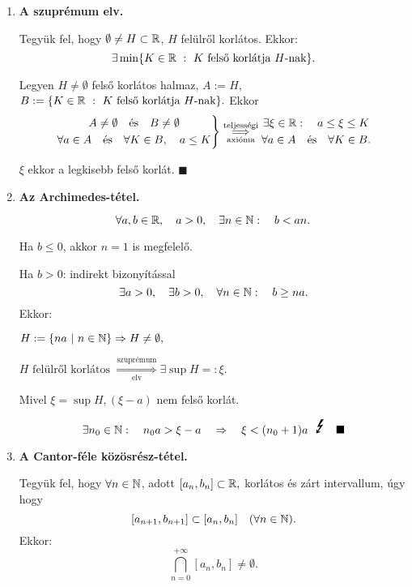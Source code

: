 \documentclass[a4paper,11.5pt]{article}
\begin{document}
	\begin{enumerate}
		\item \textbf{A szuprémum elv.}
		
		Tegyük fel, hogy $\emptyset\not=H \subset \mathbb{R}$, $H$ felülről korlátos. Ekkor:
		\[ \exists\min\{ K \in \mathbb{R}~:~K \text{ felső korlátja }H\text{-nak} \}.  \]
		
		\biz Legyen $H\not=\emptyset$ felső korlátos halmaz, $A:=H$, $B:= \{ K \in \mathbb{R}\ :\ K \text{ felső korlátja }H\text{-nak} \}.$ Ekkor 
		\[ \left.\begin{gathered}
		A \not=\emptyset\quad  \text{és} \quad B\not=\emptyset\\
		\forall a \in A\quad  \text{és} \quad \forall K \in B,\quad  a\leq K
		\end{gathered} \right\} \overset{\text{teljességi}}{\underset{\text{axióma}}{\Longrightarrow}} \begin{gathered}
		\exists \xi \in \mathbb{R}:\quad a\leq\xi\leq K\\
		\forall a \in A\quad \text{és}\quad \forall K \in B.
		\end{gathered} \]
		
		$\xi$ ekkor a legkisebb felső korlát. \quad $\blacksquare$
		
		\item \textbf{Az Archimedes-tétel.}
		
		\[\forall a, b \in \mathbb{R}, \quad a>0,\quad \exists n\in \mathbb{N}: \quad b<an.\]
		
		\biz Ha $b\leq 0$, akkor $n=1$ is megfelelő.
		
		Ha $b>0$: indirekt bizonyítással
		\[ \exists a>0,\quad \exists b>0,\quad  \forall n\in \mathbb{N}: \quad b\geq na. \]
		Ekkor:
		
		$H := \{ na\ |\ n\in\mathbb{N} \}\Rightarrow H\not=\emptyset,$
		
		$H\text{ felülről korlátos } \overset{\text{szuprémum}}{\underset{\text{elv}}{\Longrightarrow}} \exists \sup H =: \xi.$
		
		Mivel $\xi = \sup H, (\xi-a)$ nem felső korlát.
		
		\[ \exists n_0\in\N: \quad n_0a>\xi-a\quad  \Rightarrow\quad  \xi < (n_0+1)a \text{ { \LARGE\Lightning}}\quad \blacksquare\]
		
		\item \textbf{A Cantor-féle közösrész-tétel.}
		
		Tegyük fel, hogy $\forall n\in\mathbb{N}$, adott $[a_n,b_n]\subset\mathbb{R},$ korlátos és zárt intervallum, úgy hogy
		\[ [a_{n+1}, b_{n+1}] \subset [a_n,b_n]\quad (\forall n\in\mathbb{N}). \]
		Ekkor:
		\[ \bigcap_{n=0}^{+\infty}[a_n,b_n]\not=\emptyset. \]
		

\end{enumerate}
\end{document}
